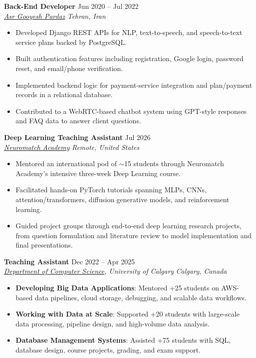 \documentclass[a4paper,10pt]{article}
\newcommand{\resumeSubheading}[4]{
    \textbf{#1} \hfill #2 \\
    \textit{#3} \hfill \textit{#4}
}
\begin{document}
\resumeSubheading
{Back-End Developer}
{Jun 2020 -- Jul 2022}
{\href{https://asr-gooyesh.com/en/}{Asr Gooyesh Pardaz}}
{Tehran, Iran}
\begin{itemize}[leftmargin=0.25in]
    \item Developed Django REST APIs for NLP, text-to-speech, and speech-to-text service plans backed by PostgreSQL.
    \item Built authentication features including registration, Google login, password reset, and email/phone verification.
    \item Implemented backend logic for payment-service integration and plan/payment records in a relational database.
    \item Contributed to a WebRTC-based chatbot system using GPT-style responses and FAQ data to answer client questions.
\end{itemize}

\resumeSubheading
{Deep Learning Teaching Assistant}
{Jul 2026}
{\href{https://neuromatch.io/}{Neuromatch Academy}}
{Remote, United States}
\begin{itemize}[leftmargin=0.25in]
    \item Mentored an international pod of $\sim$15 students through Neuromatch Academy's intensive three-week Deep Learning course.
    \item Facilitated hands-on PyTorch tutorials spanning MLPs, CNNs, attention/transformers, diffusion generative models, and reinforcement learning.
    \item Guided project groups through end-to-end deep learning research projects, from question formulation and literature review to model implementation and final presentations.
\end{itemize}

\resumeSubheading
{Teaching Assistant}
{Dec 2022 -- Apr 2025}
{\href{https://science.ucalgary.ca/computer-science} {Department of Computer Science}, University of Calgary}
{Calgary, Canada}
\begin{itemize}[leftmargin=0.25in]
    \item \textbf{Developing Big Data Applications}: Mentored +25 students on AWS-based data pipelines, cloud storage, debugging, and scalable data workflows.
    \item \textbf{Working with Data at Scale}: Supported +20 students with large-scale data processing, pipeline design, and high-volume data analysis.
    \item \textbf{Database Management Systems}: Assisted +75 students with SQL, database design, course projects, grading, and exam support.
\end{itemize}
\end{document}
